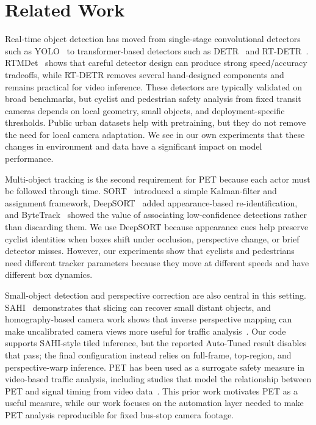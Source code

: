 \documentclass[conference]{IEEEtran}
\begin{document}
\section{Related Work}
\label{sec:related}

Real-time object detection has moved from single-stage convolutional detectors such as YOLO~\cite{redmon2016you} to transformer-based detectors such as DETR~\cite{carion2020end} and RT-DETR~\cite{zhao2024detrs}. RTMDet~\cite{lyu2022rtmdet} shows that careful detector design can produce strong speed/accuracy tradeoffs, while RT-DETR removes several hand-designed components and remains practical for video inference. These detectors are typically validated on broad benchmarks, but cyclist and pedestrian safety analysis from fixed transit cameras depends on local geometry, small objects, and deployment-specific thresholds. Public urban datasets help with pretraining, but they do not remove the need for local camera adaptation. We see in our own experiments that these changes in environment and data have a significant impact on model performance.

Multi-object tracking is the second requirement for PET because each actor must be followed through time. SORT~\cite{bewley2016simple} introduced a simple Kalman-filter and assignment framework, DeepSORT~\cite{wojke2017simple} added appearance-based re-identification, and ByteTrack~\cite{zhang2022bytetrack} showed the value of associating low-confidence detections rather than discarding them. We use DeepSORT because appearance cues help preserve cyclist identities when boxes shift under occlusion, perspective change, or brief detector misses. However, our experiments show that cyclists and pedestrians need different tracker parameters because they move at different speeds and have different box dynamics.

Small-object detection and perspective correction are also central in this setting. SAHI~\cite{akyon2022slicing} demonstrates that slicing can recover small distant objects, and homography-based camera work shows that inverse perspective mapping can make uncalibrated camera views more useful for traffic analysis~\cite{zhu2021monocular}. Our code supports SAHI-style tiled inference, but the reported Auto-Tuned result disables that pass; the final configuration instead relies on full-frame, top-region, and perspective-warp inference. PET has been used as a surrogate safety measure in video-based traffic analysis, including studies that model the relationship between PET and signal timing from video data~\cite{islam2022modelling}. This prior work motivates PET as a useful measure, while our work focuses on the automation layer needed to make PET analysis reproducible for fixed bus-stop camera footage.
\end{document}
